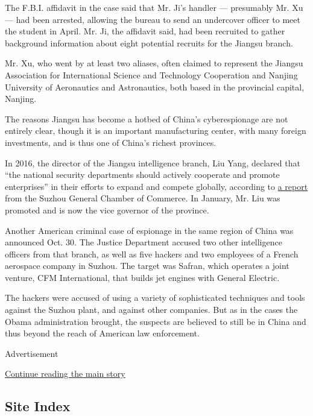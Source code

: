 The F.B.I. affidavit in the case said that Mr. Ji's handler ---
presumably Mr. Xu --- had been arrested, allowing the bureau to send an
undercover officer to meet the student in April. Mr. Ji, the affidavit
said, had been recruited to gather background information about eight
potential recruits for the Jiangsu branch.

Mr. Xu, who went by at least two aliases, often claimed to represent the
Jiangsu Association for International Science and Technology Cooperation
and Nanjing University of Aeronautics and Astronautics, both based in
the provincial capital, Nanjing.

The reasons Jiangsu has become a hotbed of China's cyberespionage are
not entirely clear, though it is an important manufacturing center, with
many foreign investments, and is thus one of China's richest provinces.

In 2016, the director of the Jiangsu intelligence branch, Liu Yang,
declared that ``the national security departments should actively
cooperate and promote enterprises'' in their efforts to expand and
compete globally, according to
\href{http://www.szcc.org.cn/news-micro/jiang-su-sheng-guo-jia-an-quan-ting-ting-chang-2978.html}{a
report} from the Suzhou General Chamber of Commerce. In January, Mr. Liu
was promoted and is now the vice governor of the province.

Another American criminal case of espionage in the same region of China
was announced Oct. 30. The Justice Department accused two other
intelligence officers from that branch, as well as five hackers and two
employees of a French aerospace company in Suzhou. The target was
Safran, which operates a joint venture, CFM International, that builds
jet engines with General Electric.

The hackers were accused of using a variety of sophisticated techniques
and tools against the Suzhou plant, and against other companies. But as
in the cases the Obama administration brought, the suspects are believed
to still be in China and thus beyond the reach of American law
enforcement.

Advertisement

\protect\hyperlink{after-bottom}{Continue reading the main story}

\hypertarget{site-index}{%
\subsection{Site Index}\label{site-index}}

